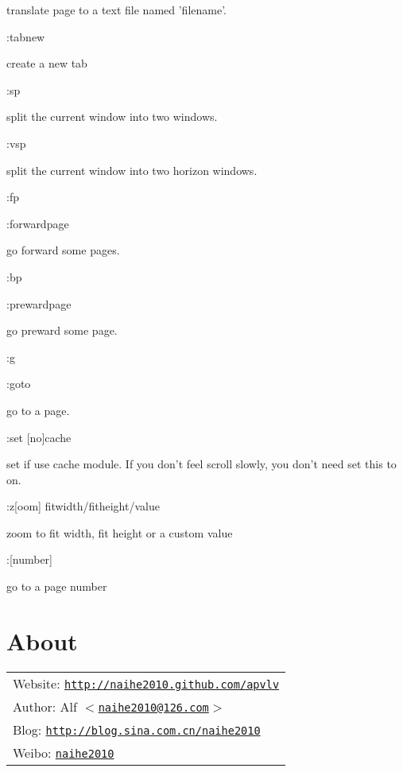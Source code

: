 \documentclass[a4paper,12pt]{article}
\begin{document}
\begin{description}
translate page to a text file named 'filename'.

\item :tabnew

create a new tab

\item :sp

split the current window into two windows.

\item :vsp

split the current window into two horizon windows.

\item :fp

\item :forwardpage 

go forward some pages.

\item :bp

\item :prewardpage

go preward some page.

\item :g

\item :goto

go to a page.

\item :set [no]cache

set if use cache module. If you don't feel scroll slowly, you don't need set this to on.

\item :z[oom] fitwidth/fitheight/value

zoom to fit width, fit height or a custom value

\item :[number]

go to a page number

\end{description}

\newpage

\section{About}\label{about}

\large
\begin{tabular}{l}
  Website: \texttt{\href{http://naihe2010.github.com/apvlv}{http://naihe2010.github.com/apvlv}} \\
  Author: Alf \texttt{\href{mailto:naihe2010@126.com}{$<$naihe2010@126.com$>$}} \\
Blog: \texttt{\href{http://blog.sina.com.cn/naihe2010}{http://blog.sina.com.cn/naihe2010}} \\
Weibo: \texttt{\href{http://weibo.com/naihe2010}{naihe2010}}
\end{tabular}
\end{document}

